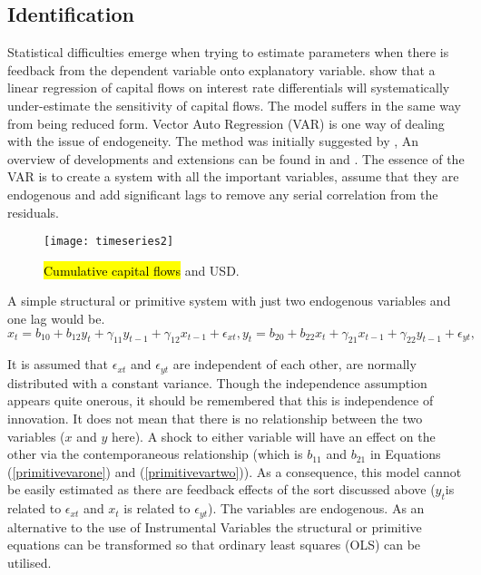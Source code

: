 \documentclass[jrfm,article,accept,moreauthors,pdftex]{Definitions/mdpi}
\begin{document}
\subsection{Identification}
Statistical difficulties emerge when trying to estimate parameters when there is feedback from the dependent variable onto explanatory variable.\citep{Kouri1974International} show that a linear regression of capital flows on interest rate differentials will systematically under-estimate the sensitivity of capital flows. The \citep{brookscapital} model suffers in the same way from being reduced form.     Vector Auto Regression (VAR) is one way of dealing with the issue of endogeneity.  The method was initially suggested by \citep{Sims1980Macroeconomics},  An overview of developments and extensions can be found in \citep{lutkepohlvar} and \citep{Hamilton}.  The essence of the VAR is to create a system with all the important variables, assume that they are endogenous and add significant lags to remove any serial correlation from the residuals.  
\begin{figure}[H]

\texttt{[image: timeseries2]}
\caption{\hl{Cumulative capital flows} %
 and USD.}
\label{figref:ts}
\end{figure}
A simple {structural} or {primitive} system with just two endogenous variables and one lag would be.
\begin{subequations}
\begin{equation}\label{primitivevarone}
x_{t}=b_{10}+b_{12}y_t+\gamma_{11}y_{t-1}+\gamma_{12}x_{t-1}+\epsilon_{xt}, 
\end{equation}
\begin{equation}\label{primitivevartwo}
y_{t}=b_{20}+b_{22}x_t+\gamma_{21}x_{t-1}+\gamma_{22}y_{t-1}+\epsilon_{yt},
 \end{equation}
\end{subequations}

It is assumed that $ \epsilon_{xt}$ and $\epsilon_{yt}$ are independent of each other, are normally distributed with a constant variance.   Though the independence assumption appears quite onerous, it should be remembered that this is independence of innovation.  It does not mean that there is no relationship between the two variables ($x$ and $y$ here). A shock to either variable will have an effect on the other via the contemporaneous relationship (which is $b_{11}$ and $b_{21}$ in Equations (\ref{primitivevarone}) and (\ref{primitivevartwo})).  As a consequence, this model cannot be easily estimated as there are feedback effects of the sort discussed above ($y_t$is related to $\epsilon_{xt}$ and $x_t$ is related to $\epsilon_{yt}$).    The variables are endogenous.  As an alternative to the use of  {Instrumental Variables} the structural or primitive equations can be transformed so that ordinary least squares (OLS) can be utilised. 
\end{document}
